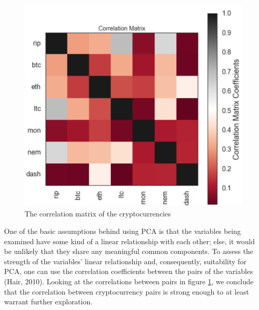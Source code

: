 \documentclass[12pt,twoside]{article}
\begin{document}
\bigbreak
\newpage
\begin{figure}[H]
\begin{center}
\includegraphics[scale=.7]{corr.png}
\caption{The correlation matrix of the cryptocurrencies}
\label{fig:basic_corr}
\end{center}
\end{figure}

\bigbreak

One of the basic assumptions behind using PCA is that the variables being examined have some kind of a linear relationship with each other; else, it would be unlikely that they share any meaningful common components. To assess the strength of the variables' linear relationship and, consequently, suitability for PCA, one can use the correlation coefficients between the pairs of the variables (Hair, 2010). Looking at the correlations between pairs in figure \ref{fig:basic_corr}, we conclude that the correlation between cryptocurrency pairs is strong enough to at least warrant further exploration.
\end{document}
